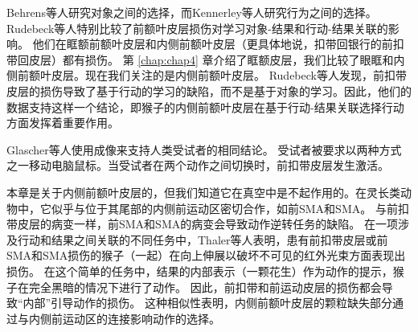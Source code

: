 Behrens等人研究对象之间的选择，而Kennerley等人研究行为之间的选择。
Rudebeck等人\cite{rudebeck2008frontal}特别比较了前额叶皮层损伤对学习对象-结果和行动-结果关联的影响。
他们在眶额前额叶皮层和内侧前额叶皮层（更具体地说，扣带回银行的前扣带回皮层）都有损伤。
第 \ref{chap:chap4} 章介绍了眶额皮层，我们比较了眼眶和内侧前额叶皮层。现在我们关注的是内侧前额叶皮层。
Rudebeck等人发现，前扣带皮层的损伤导致了基于行动的学习的缺陷，而不是基于对象的学习。因此，他们的数据支持这样一个结论，即猴子的内侧前额叶皮层在基于行动-结果关联选择行动方面发挥着重要作用。\par
Glascher等人\cite{glascher2009determining}使用成像来支持人类受试者的相同结论。
受试者被要求以两种方式之一移动电脑鼠标。当受试者在两个动作之间切换时，前扣带皮层发生激活。\par
本章是关于内侧前额叶皮层的，但我们知道它在真空中是不起作用的。在灵长类动物中，它似乎与位于其尾部的内侧前运动区密切合作，如前SMA和SMA。
与前扣带皮层的病变一样\cite{kennerley2006optimal}，前SMA和SMA的病变会导致动作逆转任务的缺陷\cite{chen1995functions}。
在一项涉及行动和结果之间关联的不同任务中，Thaler等人\cite{thaler1995functions}表明，患有前扣带皮层或前SMA和SMA损伤的猴子（一起）在向上伸展以破坏不可见的红外光束方面表现出损伤。
在这个简单的任务中，结果的内部表示（一颗花生）作为动作的提示，猴子在完全黑暗的情况下进行了动作。
因此，前扣带和前运动皮层的损伤都会导致“内部”引导动作的损伤。
这种相似性表明，内侧前额叶皮层的颗粒缺失部分通过与内侧前运动区的连接影响动作的选择。\par



